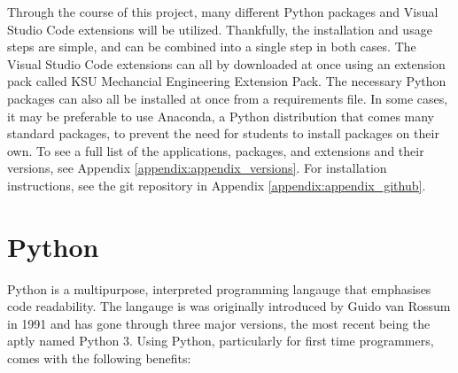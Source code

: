 Through the course of this project, many different Python packages and Visual Studio Code extensions will
be utilized. Thankfully, the installation and usage steps are simple, and can be combined into a single 
step in both cases. The Visual Studio Code extensions can all by downloaded at once using an
extension pack called KSU Mechancial Engineering Extension Pack. The necessary Python packages can also
all be installed at once from a requirements file. In some cases, it may be preferable to use Anaconda,
a Python distribution that comes many standard packages, to prevent the need for students to install
packages on their own. To see a full list of the applications, packages, and extensions and their versions, 
see Appendix \ref{appendix:appendix_versions}. For installation instructions, see the git repository in 
Appendix \ref{appendix:appendix_github}. 

\section{Python}

Python is a multipurpose, interpreted programming langauge that emphasises code readability. The langauge is
was originally introduced by Guido van Rossum in 1991 and has gone through three major versions,
the most recent being the aptly named Python 3. Using Python, particularly for first time programmers,
comes with the following benefits:

